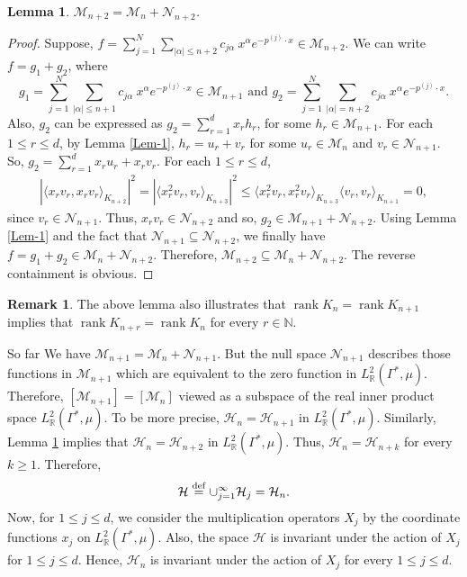 \documentclass[11pt,reqno]{amsart}
\theoremstyle{plain}
\newtheorem{lemma}[theorem]{Lemma}
\theoremstyle{definition}
\newtheorem{remark}[theorem]{Remark}
\numberwithin{equation}{section}
\newcommand{\bydef}{\stackrel{\rm def}{=}}
\begin{document}
	\begin{lemma} \label{Lem-4}
		$\mathcal{M}_{n+2} = \mathcal{M}_n + \mathcal{N}_{n+2}$.
	\end{lemma}
	\begin{proof}
		Suppose, $f = \sum_{j=1}^N \sum_{|\alpha|\leq n+2} c_{j \alpha} \ x^\alpha e^{-p^{(j)} \cdot x} \in \mathcal{M}_{n+2}$. We can write $f= g_1 + g_2$,
		where 
		$$
		g_1 = \sum_{j=1}^N \sum_{|\alpha|\leq n+1} c_{j \alpha} \ x^\alpha e^{-p^{(j)} \cdot x} \in \mathcal{M}_{n+1} \text{ and }
		g_2= \sum_{j=1}^N \sum_{|\alpha|= n+2} c_{j \alpha} \ x^\alpha e^{-p^{(j)} \cdot x}.
		$$
		Also, $g_2$ can be expressed as $g_2 = \sum_{r=1}^d x_r h_r$, for some $h_r \in \mathcal{M}_{n+1}$. For each $1\leq r \leq d$, by Lemma \ref{Lem-1}, $h_r = u_r + v_r$ for some $u_r \in \mathcal{M}_n$ and $v_r \in \mathcal{N}_{n+1}$. So, $g_2 = \sum_{r=1}^d x_r u_r + x_r v_r$. 
		For each $1\leq r\leq d$,
		\begin{align*}
			|\langle x_r v_r, x_r v_r \rangle_{K_{n+2}}|^2 = |\langle x_r^2 v_r, v_r \rangle_{K_{n+3}}|^2 \leq \langle x_r^2 v_r, x_r^2 v_r \rangle_{K_{n+3}} \langle v_r, v_r \rangle_{K_{n+1}} =0,
		\end{align*}
		since $v_r \in \mathcal{N}_{n+1}$. Thus, $x_r v_r \in \mathcal{N}_{n+2}$ and so, $g_2 \in \mathcal{M}_{n+1} + \mathcal{N}_{n+2}$. Using Lemma \ref{Lem-1} and the fact that $\mathcal{N}_{n+1} \subseteq \mathcal{N}_{n+2}$, we finally have $f=g_1 + g_2 \in \mathcal{M}_n + \mathcal{N}_{n+2}$. Therefore, $\mathcal{M}_{n+2} \subseteq \mathcal{M}_n + \mathcal{N}_{n+2}$. The reverse containment is obvious.
	\end{proof}
	\begin{remark}
		The above lemma also illustrates that $\operatorname{rank} K_{n}= \operatorname{rank} K_{n+1}$ implies that $\operatorname{rank} K_{n+r} =\operatorname{rank} K_n$ for every $r\in \mathbb{N}$.
	\end{remark}
	
	\vspace{3mm}
	So far We have $\mathcal{M}_{n+1} = \mathcal{M}_n + \mathcal{N}_{n+1}$. But the null space $\mathcal{N}_{n+1}$ describes those functions in $\mathcal{M}_{n+1}$ which are equivalent to the zero function in $L^2_\mathbb{R}(\Gamma^*, \mu)$. Therefore, $[\mathcal{M}_{n+1}] = [\mathcal{M}_n]$ viewed as a subspace of the real inner product space $L^2_\mathbb{R}(\Gamma^*, \mu)$. To be more precise, $\mathcal{H}_n = \mathcal{H}_{n+1}$ in $L^2_\mathbb{R}(\Gamma^*, \mu)$. Similarly, Lemma \ref{Lem-4} implies that $\mathcal{H}_{n} = \mathcal{H}_{n+2}$ in $L^2_\mathbb{R}(\Gamma^*, \mu)$. Thus, $\mathcal{H}_{n} = \mathcal{H}_{n+k}$ for every $k\geq 1$. Therefore,
	\begin{align*}
		\mathcal{H} \bydef \cup_{j=1}^\infty \mathcal{H}_j = \mathcal{H}_n.
	\end{align*}
	Now, for $1\leq j \leq d$, we consider the multiplication operators $X_j$ by the coordinate functions $x_j$ on $L^2_\mathbb{R}(\Gamma^*, \mu)$.
	Also, the space $\mathcal{H}$ is invariant under the action of $X_j$ for $1\leq j \leq d$. Hence, $\mathcal{H}_n$ is invariant under the action of $X_j$ for every $1\leq j \leq d$. 
	
\end{document}
